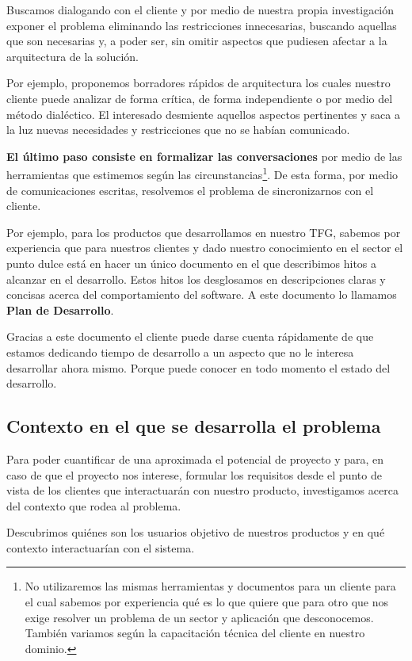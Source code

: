 Buscamos dialogando con el cliente y por medio de nuestra propia investigación exponer
el problema eliminando las restricciones innecesarias, buscando aquellas que son
necesarias y, a poder ser, sin omitir aspectos que pudiesen afectar a la arquitectura
de la solución.

Por ejemplo, proponemos borradores rápidos de arquitectura los cuales
nuestro cliente puede analizar de forma crítica, de forma independiente
o por medio del método dialéctico. El interesado desmiente aquellos aspectos
pertinentes y saca a la luz nuevas necesidades y restricciones que no se habían
comunicado.

\textbf{El último paso consiste en formalizar las conversaciones} por medio de las
herramientas que estimemos según las circunstancias\footnote{%
    No utilizaremos las mismas herramientas y documentos para un cliente para el cual
    sabemos por experiencia qué es lo que quiere que para otro que nos exige resolver
    un problema de un sector y aplicación que desconocemos. También variamos según
    la capacitación técnica del cliente en nuestro dominio.
}. De esta forma, por medio de comunicaciones escritas, resolvemos el problema de
sincronizarnos con el cliente.

Por ejemplo, para los productos que desarrollamos en nuestro TFG, sabemos por experiencia
que para nuestros clientes y dado nuestro conocimiento en el sector el punto dulce está
en hacer un único documento en el que describimos hitos a alcanzar en el desarrollo.
Estos hitos los desglosamos en descripciones claras y concisas acerca del comportamiento del software.
A este documento lo llamamos \textbf{Plan de Desarrollo}.

Gracias a este documento el cliente puede darse
cuenta rápidamente de que estamos dedicando tiempo de desarrollo a un aspecto que no le
interesa desarrollar ahora mismo. Porque puede conocer en todo momento el estado del desarrollo.

\subsection{Contexto en el que se desarrolla el problema}

Para poder cuantificar de una aproximada el potencial de proyecto y para, en caso de que el
proyecto nos interese, formular los requisitos desde el punto de vista de los clientes que
interactuarán con nuestro producto, investigamos acerca del contexto que rodea al problema.

Descubrimos quiénes son los usuarios objetivo de nuestros productos y en qué contexto
interactuarían con el sistema.

